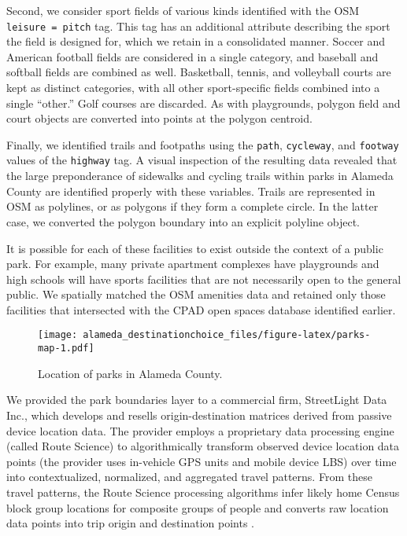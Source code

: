 \documentclass[3p, authoryear]{elsarticle} %
\makeatletter
\def\maxwidth{\ifdim\Gin@nat@width>\linewidth\linewidth
\else\Gin@nat@width\fi}
\let\Oldincludegraphics\includegraphics
\renewcommand{\includegraphics}[1]{\Oldincludegraphics[width=\maxwidth]{#1}}
\makeatother
\begin{document}
Second, we consider sport fields of various kinds identified with the OSM
\texttt{leisure\ =\ pitch} tag. This tag has an additional attribute describing the sport
the field is designed for, which we retain in a consolidated manner. Soccer and
American football fields are considered in a single category, and baseball and
softball fields are combined as well. Basketball, tennis, and volleyball courts
are kept as distinct categories, with all other sport-specific fields combined
into a single ``other.'' Golf courses are discarded. As with playgrounds, polygon
field and court objects are converted into points at the polygon centroid.

Finally, we identified trails and footpaths using the \texttt{path}, \texttt{cycleway}, and
\texttt{footway} values of the \texttt{highway} tag. A visual inspection of the resulting data
revealed that the large preponderance of sidewalks and cycling trails within parks
in Alameda County are identified properly with these variables. Trails are
represented in OSM as polylines, or as polygons if they form a complete circle.
In the latter case, we converted the polygon boundary into an explicit polyline object.

It is possible for each of these facilities to exist outside the context of
a public park. For example, many private apartment complexes have playgrounds
and high schools will have sports facilities that are not necessarily open to
the general public. We spatially matched the OSM amenities data and retained
only those facilities that intersected with the CPAD open spaces database
identified earlier.

\begin{figure}
\centering
\texttt{[image: alameda\_destinationchoice\_files/figure-latex/parks-map-1.pdf]}
\caption{\label{fig:parks-map}Location of parks in Alameda County.}
\end{figure}

We provided the park boundaries layer to a commercial firm, StreetLight Data
Inc., which develops and resells origin-destination matrices derived from
passive device location data. The provider employs a proprietary data processing
engine (called Route Science) to algorithmically transform observed device
location data points (the provider uses in-vehicle GPS units and mobile device
LBS) over time into contextualized, normalized, and aggregated travel patterns.
From these travel patterns, the Route Science processing algorithms infer likely
home Census block group locations for composite groups of people and converts
raw location data points into trip origin and destination points \citep{Pan2006, Friedrich2010}.
\end{document}
